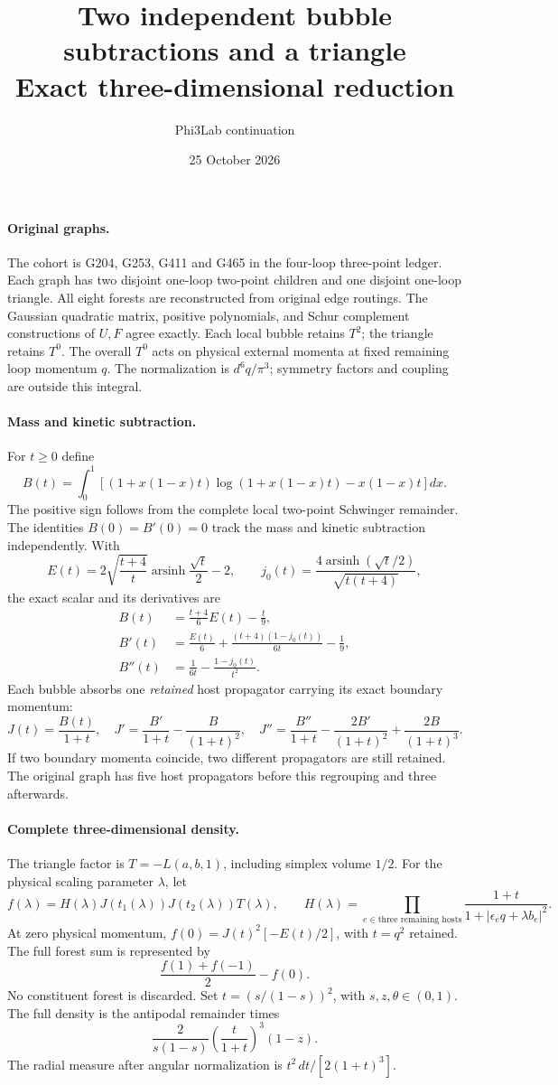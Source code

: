 \documentclass[11pt]{article}
\title{Two independent bubble subtractions and a triangle\\Exact three-dimensional reduction}
\author{Phi3Lab continuation}
\date{25 October 2026}
\begin{document}
\maketitle

\paragraph{Original graphs.}
The cohort is G204, G253, G411 and G465 in the four-loop three-point ledger. Each graph has two disjoint one-loop two-point children and one disjoint one-loop triangle.
All eight forests are reconstructed from original edge routings.
The Gaussian quadratic matrix, positive polynomials, and Schur complement constructions of $U,F$ agree exactly.
Each local bubble retains $T^2$; the triangle retains $T^0$.
The overall $T^0$ acts on physical external momenta at fixed remaining loop momentum $q$.
The normalization is $d^6q/\pi^3$; symmetry factors and coupling are outside this integral.

\paragraph{Mass and kinetic subtraction.}
For $t\geq0$ define
\[
B(t)=\int_0^1\!\left[(1+x(1-x)t)\log(1+x(1-x)t)-x(1-x)t\right]dx .
\]
The positive sign follows from the complete local two-point Schwinger remainder.
The identities $B(0)=B'(0)=0$ track the mass and kinetic subtraction independently.
With
\[
E(t)=2\sqrt{\frac{t+4}{t}}\operatorname{arsinh}\frac{\sqrt t}{2}-2,\qquad
j_0(t)=\frac{4\operatorname{arsinh}(\sqrt t/2)}{\sqrt{t(t+4)}},
\]
the exact scalar and its derivatives are
\begin{align*}
B(t)&=\frac{t+4}{6}E(t)-\frac t9,\\
B'(t)&=\frac{E(t)}6+\frac{(t+4)(1-j_0(t))}{6t}-\frac19,\\
B''(t)&=\frac1{6t}-\frac{1-j_0(t)}{t^2}.
\end{align*}
Each bubble absorbs one \emph{retained} host propagator carrying its exact boundary momentum:
\[
J(t)=\frac{B(t)}{1+t},\quad
J'=\frac{B'}{1+t}-\frac B{(1+t)^2},\quad
J''=\frac{B''}{1+t}-\frac{2B'}{(1+t)^2}+\frac{2B}{(1+t)^3}.
\]
If two boundary momenta coincide, two different propagators are still retained.
The original graph has five host propagators before this regrouping and three afterwards.

\paragraph{Complete three-dimensional density.}
The triangle factor is $T=-L(a,b,1)$, including simplex volume $1/2$.
For the physical scaling parameter $\lambda$, let
\[
f(\lambda)=H(\lambda)J(t_1(\lambda))J(t_2(\lambda))T(\lambda),
\qquad
H(\lambda)=\prod_{e\in\text{three remaining hosts}}
\frac{1+t}{1+|\epsilon_e q+\lambda b_e|^2}.
\]
At zero physical momentum, $f(0)=J(t)^2[-E(t)/2]$, with $t=q^2$ retained.
The full forest sum is represented by
\[
\frac{f(1)+f(-1)}2-f(0).
\]
No constituent forest is discarded.
Set $t=(s/(1-s))^2$, with $s,z,\theta\in(0,1)$.
The full density is the antipodal remainder times
\[
\frac{2}{s(1-s)}\left(\frac{t}{1+t}\right)^3(1-z).
\]
The radial measure after angular normalization is
$t^2\,dt/[2(1+t)^3]$.
\end{document}
